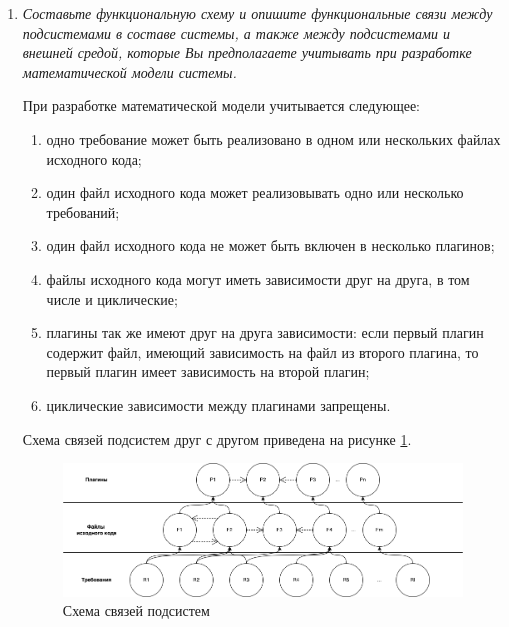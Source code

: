 \documentclass{article}
\begin{document}
\begin{enumerate}
        Альтернативу <<1 требование - 1 плагин>> целесообразно применять при $|R^*| \not \gg 0$.

        Альтернативу <<все требования - 1 плагин>> целесообразно применять при выполнении $|R^*_{n}| \approx |R^*|$ в различных поставках.

        \item \textit{Составьте функциональную схему и опишите функциональные связи между подсистемами в составе системы, а также между подсистемами и внешней средой, которые Вы предполагаете учитывать при разработке математической модели системы.}

        При разработке математической модели учитывается следующее:
        \begin{enumerate}
            \item одно требование может быть реализовано в одном или нескольких файлах исходного кода;
            \item один файл исходного кода может реализовывать одно или несколько требований;
            \item один файл исходного кода не может быть включен в несколько плагинов;
            \item файлы исходного кода могут иметь зависимости друг на друга, в том числе и циклические;
            \item плагины так же имеют друг на друга зависимости: если первый плагин содержит файл, имеющий зависимость на файл из второго плагина, то первый плагин имеет зависимость на второй плагин;
            \item циклические зависимости между плагинами запрещены.
        \end{enumerate}

        Схема связей подсистем друг с другом приведена на рисунке \ref{fig:graph}.

        \begin{figure}[H]
            \centering
            \includegraphics[width=1\textwidth]{graph}
            \caption{Схема связей подсистем}
            \label{fig:graph}
        \end{figure}


\end{enumerate}
\end{document}
